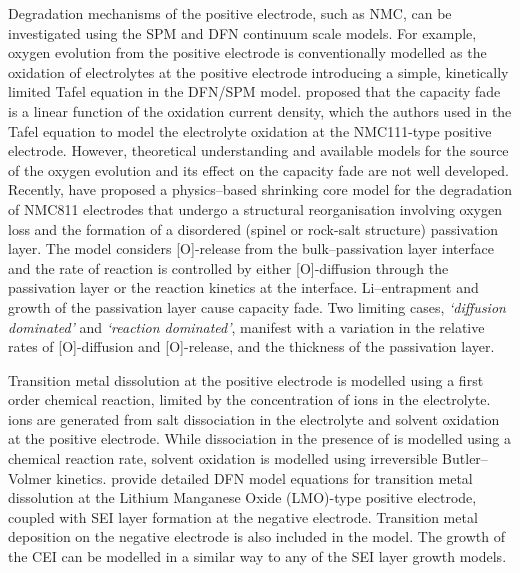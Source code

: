 \documentclass[journal=jacsat,manuscript=article]{achemso}
\begin{document}
Degradation mechanisms of the positive electrode, such as NMC, can be investigated using the SPM\cite{reniers2019review,jana2019physical} and DFN\cite{lin2013comprehensive} continuum scale models.
For example, oxygen evolution from the positive electrode is conventionally modelled as the oxidation of electrolytes at the positive electrode introducing a simple, kinetically limited Tafel equation\cite{lin2013comprehensive,reniers2019review} in the DFN/SPM model. 
\citeauthor{jana2019physical} proposed that the capacity fade is a linear function of the oxidation current density, which the authors used in the Tafel equation to model the electrolyte oxidation at the NMC111-type positive electrode.\cite{jana2019physical} 
However, theoretical understanding and available models for the source of the oxygen evolution and its effect on the capacity fade are not well developed. 
Recently, \citeauthor{ghosh2020shrinking} have proposed a physics--based shrinking core model for the degradation of NMC811 electrodes that undergo a structural reorganisation involving oxygen loss and the formation of a disordered (spinel or rock-salt structure) passivation layer.\cite{ghosh2020shrinking} 
The model considers [O]-release from the bulk--passivation layer interface and the rate of reaction is controlled by either [O]-diffusion through the passivation layer or the reaction kinetics at the interface. 
Li--entrapment and growth of the passivation layer cause capacity fade. 
Two limiting cases, \textit{`diffusion dominated'} and \textit{`reaction dominated'}, manifest with a variation in the relative rates of [O]-diffusion and [O]-release, and the thickness of the passivation layer.

Transition metal dissolution at the positive electrode is modelled using a first order chemical reaction, limited by the concentration of  ions in the electrolyte.\cite{dai2012capacity}
 ions are generated from  salt dissociation in the electrolyte and solvent oxidation at the positive electrode. 
While  dissociation in the presence of  is modelled using a chemical reaction rate, solvent oxidation is modelled using irreversible Butler--Volmer kinetics.\cite{dai2012capacity} 
\citeauthor{lin2013comprehensive} provide detailed DFN model equations for transition metal dissolution at the Lithium Manganese Oxide (LMO)-type positive electrode, coupled with SEI layer formation at the negative electrode.
Transition metal deposition on the negative electrode is also included in the model.\cite{lin2013comprehensive} 
The growth of the CEI can be modelled in a similar way to any of the SEI layer growth models.
\end{document}
